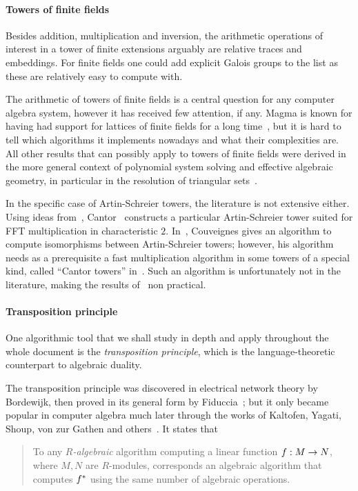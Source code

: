 \paragraph{Towers of finite fields}
\label{sec:towers-extensions}
Besides addition, multiplication and inversion, the arithmetic
operations of interest in a tower of finite extensions arguably are
relative traces and embeddings. For finite fields one could add
explicit Galois groups to the list as these are relatively easy to
compute with.

The arithmetic of towers of finite fields is a central question for
any computer algebra system, however it has received few attention, if
any. Magma is known for having had support for lattices of finite
fields for a long time~\cite{bosma+cannon+steel97}, but it is hard to
tell which algorithms it implements nowadays and what their
complexities are. All other results that can possibly apply to towers
of finite fields were derived in the more general context of
polynomial system solving and effective algebraic geometry, in
particular in the resolution of triangular
sets~\cite{diaz+gonzalez01,giusti+lecerf+salvy01,bostan+salvy+schost03,pascal+schost06,li+moreno+schost07,dahan+jin+moreno+schost08,boulier+lemaire+moreno01,FGLM,rouiller99,alonso+becker+roy+wormann}.

In the specific case of Artin-Schreier towers, the literature is not
extensive either.  Using ideas from~\cite{Conway:ONAG2000},
Cantor~\cite{cantor89} constructs a particular Artin-Schreier tower
suited for FFT multiplication in characteristic
$2$. In~\cite{couveignes00}, Couveignes gives an algorithm to compute
isomorphisms between Artin-Schreier towers; however, his algorithm
needs as a prerequisite a fast multiplication algorithm in some towers
of a special kind, called ``Cantor towers''
in~\cite{couveignes00}. Such an algorithm is unfortunately not in the
literature, making the results of~\cite{couveignes00} non practical.


\paragraph{Transposition principle}
\label{sec:transp-princ}
One algorithmic tool that we shall study in depth and apply throughout
the whole document is the \emph{transposition principle}, which is the
language-theoretic counterpart to algebraic duality.

The transposition principle was discovered in electrical network
theory by Bordewijk\cite{bordewijk57}, then proved in its general form
by Fiduccia~\cite{fiduccia:phd}; but it only became popular in
computer algebra much later through the works of Kaltofen, Yagati,
Shoup, von zur Gathen and
others~\cite{kaltofen+lakshman89,vzgathen+shoup92,shoup94,shoup95,shoup99,hanrot+quercia+zimmermann}. It
states that
\begin{quote}
  To any \emph{$R$-algebraic} algorithm computing a linear function
  $f:M\rightarrow N$, where $M,N$ are $R$-modules, corresponds an algebraic
  algorithm that computes $f^\ast$ using the same number of
  algebraic operations.
\end{quote}

